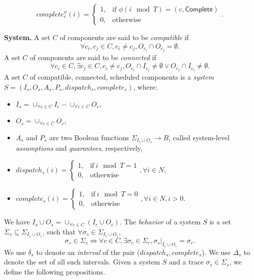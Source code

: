 \begin{equation*}
\label{eqn:complete}
    complete_c^\phi(i) =
    \begin{cases}
      1, & \text{if } \phi(i \mod T) = (c, \textsf{Complete}) \\
      0, & \text{otherwise}
    \end{cases}.
\end{equation*}

{\bf System.}
A set $C$ of components are said to be \emph{compatible} if 
\begin{equation*}
	\forall c_i,c_j \in C, c_i\neq c_j, O_{c_i} \cap O_{c_j} = \emptyset.
\end{equation*}
A set $C$ of components are said to be \emph{connected} if
\begin{equation*}
	\forall c_i \in C, \exists c_j \in C, c_i\neq c_j, O_{c_i} \cap I_{c_j} \neq \emptyset \vee O_{c_j} \cap I_{c_i} \neq \emptyset.
\end{equation*}
A set $C$ of compatible, connected, scheduled components is a \emph{system} $S = (I_s, O_s, A_s, P_s, dispatch_s, complete_s)$, where:
\begin{itemize}
	\item $I_s = \cup_{\forall c \in C}I_c -  \cup_{\forall c \in C}O_c$,
	\item $O_s = \cup_{\forall c \in C}O_c$,
	\item $A_s$ and $P_s$ are two Boolean functions $\Sigma_{I_s \cup O_s} \rightarrow B$, called system-level \emph{assumptions} and \emph{guarantees}, respectively,
	\item $dispatch_s (i) = 
	    	\begin{cases}
      		1, & \text{if}\ i \mod T =1 \\
	     	0, & \text{otherwise}
   	 	\end{cases}, \forall i \in N$,
   	\item $complete_s (i) =
   		\begin{cases}
      		1, & \text{if}\ i \mod T = 0 \\
	     	0, & \text{otherwise}
   	 	\end{cases}, \forall i \in N, i > 0$.
\end{itemize}
We have $I_s  \cup O_s = \cup_{\forall c \in C}(I_c \cup O_c)$.
The \emph{behavior} of a system $S$ is a set $\Sigma_s \subseteq \Sigma_{I_s \cup O_s}$, such that $\forall \sigma_s \in \Sigma_{I_s \cup O_s}$, 
\begin{equation*}
	\sigma_s\in \Sigma_s  \iff \forall c \in C, \exists \sigma_c \in \Sigma_c, \sigma_s|_{I_c \cup O_c} = \sigma_c.
\end{equation*}
We use $\delta_s$ to denote an \emph{interval} of the pair ($dispatch_s, complete_s$). We use $\Delta_s$ to denote the set of all such intervals.
Given a system $S$ and a trace $\sigma_s\in \Sigma_s$, we define the following propositions.

